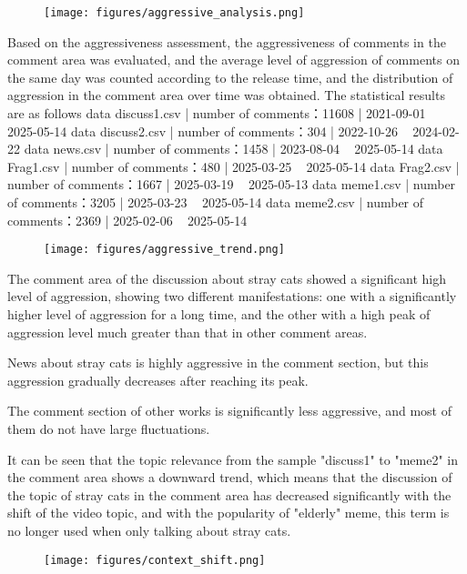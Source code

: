 \documentclass[12pt,a4paper]{ctexart}
\begin{document}
\begin{figure}[htbp]
    \centering
    \texttt{[image: figures/aggressive\_analysis.png]}
\end{figure}

Based on the aggressiveness assessment, the aggressiveness of comments in the comment area was evaluated, and the average level of aggression of comments on the same day was counted according to the release time, and the distribution of aggression in the comment area over time was obtained.
The statistical results are as follows
data discuss1.csv | number of comments：11608 | 2021-09-01 ~ 2025-05-14
data discuss2.csv | number of comments：304 | 2022-10-26 ~ 2024-02-22
data news.csv | number of comments：1458 | 2023-08-04 ~ 2025-05-14
data Frag1.csv | number of comments：480 | 2025-03-25 ~ 2025-05-14
data Frag2.csv | number of comments：1667 | 2025-03-19 ~ 2025-05-13
data meme1.csv | number of comments：3205 | 2025-03-23 ~ 2025-05-14
data meme2.csv | number of comments：2369 | 2025-02-06 ~ 2025-05-14

\begin{figure}[htbp]
    \centering
    \texttt{[image: figures/aggressive\_trend.png]}
\end{figure}

The comment area of the discussion about stray cats showed a significant high level of aggression, showing two different manifestations: one with a significantly higher level of aggression for a long time, and the other with a high peak of aggression level much greater than that in other comment areas.

News about stray cats is highly aggressive in the comment section, but this aggression gradually decreases after reaching its peak.

The comment section of other works is significantly less aggressive, and most of them do not have large fluctuations.

It can be seen that the topic relevance from the sample "discuss1" to "meme2" in the comment area shows a downward trend, which means that the discussion of the topic of stray cats in the comment area has decreased significantly with the shift of the video topic, and with the popularity of "elderly" meme, this term is no longer used when only talking about stray cats.

\begin{figure}[htbp]
    \centering
    \texttt{[image: figures/context\_shift.png]}
\end{figure}
\end{document}
